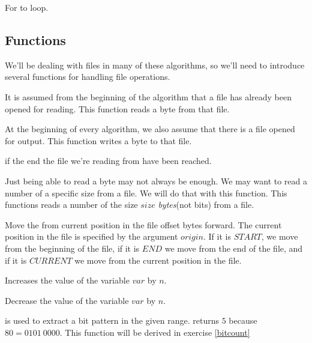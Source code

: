 \begin{algorithm}
  \caption{For to loop.}
  \label{alg:forto}
  \begin{algorithmic}[1]
    \EndFor
  \end{algorithmic}
\end{algorithm}

\subsection{Functions}
\label{sec:pseudocode}

We'll be dealing with files in many of these algorithms, so we'll need
to introduce several functions for handling file operations.

\begin{description}[font=\normalfont]
\item[\textproc{ReadByte}] It is assumed from the beginning of the
  algorithm that a file has already been opened for reading. This
  function reads a byte from that file.

\item[\Call{WriteByte}{$byte$}] At the beginning of every algorithm,
  we also assume that there is a file opened for output. This function
  writes a byte to that file.

\item[\textproc{EndOfFileReached}] \True{} if the end the file we're
  reading from have been reached.

\item[\Call{Read}{$size$}] Just being able to read a byte may not
  always be enough. We may want to read a number of a specific size
  from a file. We will do that with this function. This functions
  reads a number of the size $size$ \textit{bytes}(not bits) from a
  file.

\item[\Call{Seek}{$offset,origin$}] Move the from current position in
  the file offset bytes forward. The current position in the file is
  specified by the argument $origin$. If it is $START$, we move from the
  beginning of the file, if it is $END$ we move from the end of the
  file, and if it is $CURRENT$ we move from the current position in
  the file.

\item[\Call{Inc}{\ensuremath{var,n}}] Increases the value of the
  variable $var$ by $n$.

\item[\Call{Dec}{\ensuremath{var,n}}] Decrease the value of the
  variable $var$ by $n$.


\item[\Call{getbits}{$b, start, end$}] is used to extract a bit
  pattern in the given range.  returns
  $5$ because $80 = 0101\ 0000$. This function will be derived in
  exercise \ref{bitcount}

\end{description}

